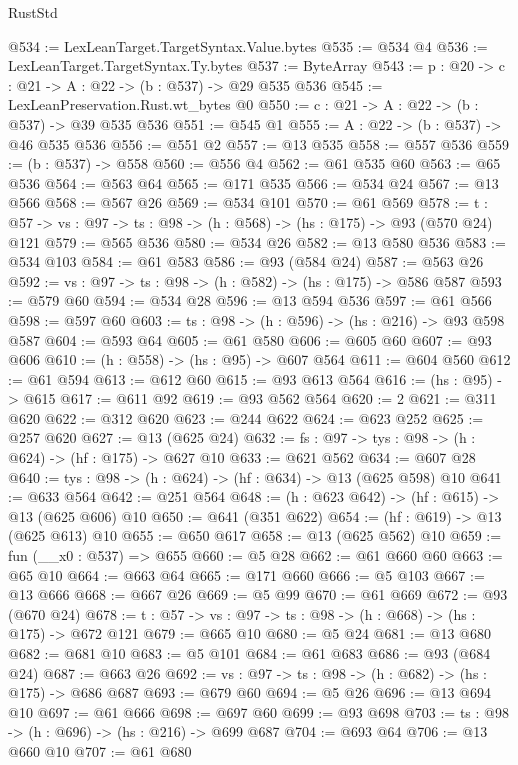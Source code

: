 \begin{lexlean}{RustStd}
\begin{coremodule}
@534 := LexLeanTarget.TargetSyntax.Value.bytes
@535 := @534 @4
@536 := LexLeanTarget.TargetSyntax.Ty.bytes
@537 := ByteArray
@543 := {p : @20} -> {c : @21} -> {A : @22} -> (b : @537) -> @29 @535 @536
@545 := LexLeanPreservation.Rust.wt_bytes @0
@550 := {c : @21} -> {A : @22} -> (b : @537) -> @39 @535 @536
@551 := @545 @1
@555 := {A : @22} -> (b : @537) -> @46 @535 @536
@556 := @551 @2
@557 := @13 @535
@558 := @557 @536
@559 := (b : @537) -> @558
@560 := @556 @4
@562 := @61 @535 @60
@563 := @65 @536
@564 := @563 @64
@565 := @171 @535
@566 := @534 @24
@567 := @13 @566
@568 := @567 @26
@569 := @534 @101
@570 := @61 @569
@578 := {t : @57} -> {vs : @97} -> {ts : @98} -> (h : @568) -> (hs : @175) -> @93 (@570 @24) @121
@579 := @565 @536
@580 := @534 @26
@582 := @13 @580 @536
@583 := @534 @103
@584 := @61 @583
@586 := @93 (@584 @24)
@587 := @563 @26
@592 := {vs : @97} -> {ts : @98} -> (h : @582) -> (hs : @175) -> @586 @587
@593 := @579 @60
@594 := @534 @28
@596 := @13 @594 @536
@597 := @61 @566
@598 := @597 @60
@603 := {ts : @98} -> (h : @596) -> (hs : @216) -> @93 @598 @587
@604 := @593 @64
@605 := @61 @580
@606 := @605 @60
@607 := @93 @606
@610 := (h : @558) -> (hs : @95) -> @607 @564
@611 := @604 @560
@612 := @61 @594
@613 := @612 @60
@615 := @93 @613 @564
@616 := (hs : @95) -> @615
@617 := @611 @92
@619 := @93 @562 @564
@620 := 2
@621 := @311 @620
@622 := @312 @620
@623 := @244 @622
@624 := @623 @252
@625 := @257 @620
@627 := @13 (@625 @24)
@632 := {fs : @97} -> {tys : @98} -> (h : @624) -> (hf : @175) -> @627 @10
@633 := @621 @562
@634 := @607 @28
@640 := {tys : @98} -> (h : @624) -> (hf : @634) -> @13 (@625 @598) @10
@641 := @633 @564
@642 := @251 @564
@648 := (h : @623 @642) -> (hf : @615) -> @13 (@625 @606) @10
@650 := @641 (@351 @622)
@654 := (hf : @619) -> @13 (@625 @613) @10
@655 := @650 @617
@658 := @13 (@625 @562) @10
@659 := fun (__x0 : @537) => @655
@660 := @5 @28
@662 := @61 @660 @60
@663 := @65 @10
@664 := @663 @64
@665 := @171 @660
@666 := @5 @103
@667 := @13 @666
@668 := @667 @26
@669 := @5 @99
@670 := @61 @669
@672 := @93 (@670 @24)
@678 := {t : @57} -> {vs : @97} -> {ts : @98} -> (h : @668) -> (hs : @175) -> @672 @121
@679 := @665 @10
@680 := @5 @24
@681 := @13 @680
@682 := @681 @10
@683 := @5 @101
@684 := @61 @683
@686 := @93 (@684 @24)
@687 := @663 @26
@692 := {vs : @97} -> {ts : @98} -> (h : @682) -> (hs : @175) -> @686 @687
@693 := @679 @60
@694 := @5 @26
@696 := @13 @694 @10
@697 := @61 @666
@698 := @697 @60
@699 := @93 @698
@703 := {ts : @98} -> (h : @696) -> (hs : @216) -> @699 @687
@704 := @693 @64
@706 := @13 @660 @10
@707 := @61 @680

\end{coremodule}
\end{lexlean}
